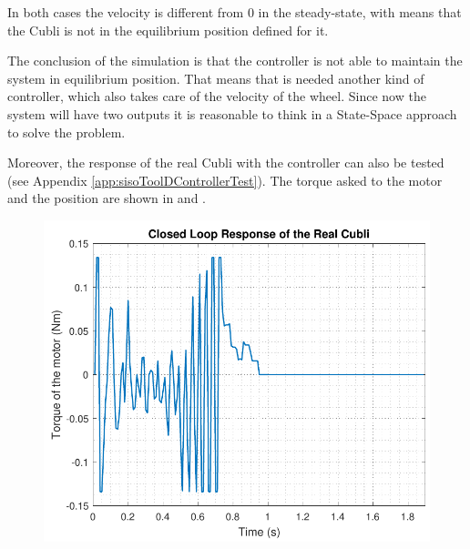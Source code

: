 In both cases the velocity is different from 0 in the steady-state, with means that the Cubli is not in the equilibrium position defined for it. 

The conclusion of the simulation is that the controller is not able to maintain the system in equilibrium position. That means that is needed another kind of controller, which also takes care of the velocity of the wheel. Since now the system will have two outputs it is reasonable to think in a State-Space approach to solve the problem.

Moreover, the response of the real Cubli with the controller can also be tested (see Appendix \ref{app:sisoToolDControllerTest}). The torque asked to the motor and the position are shown in  and .

\begin{minipage}{0.45\linewidth}
	\begin{figure}[H]
		\centering
		\includegraphics[scale=.53]{figures/torqueTestTustinPre}
		\captionsetup{justification=centering}
		\label{torqueTustinPre}
	\end{figure}\vspace{-5mm}
\end{minipage}
\hspace{0.03\linewidth}
